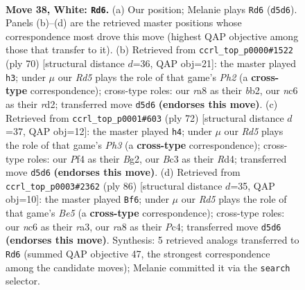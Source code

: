 \documentclass[11pt]{article}
\begin{document}
\clearpage

\begin{figure}[p]\centering
\begin{subfigure}{0.46\textwidth}\centering
\resizebox{\linewidth}{!}{%
\newchessgame
\chessboard[
  setfen={r4k2/7r/p1n5/3R4/1P3P2/2B3K1/P3b3/R7 w - - 9 38},
  showmover=false,
  pgfstyle=straightmove, color=movearrow, markmove={d5-d6}
]}
\caption{}
\end{subfigure}\hfill
\begin{subfigure}{0.46\textwidth}\centering
\resizebox{\linewidth}{!}{%
\newchessgame
\chessboard[
  setfen={7k/5R2/4B1pp/p7/P5P1/8/1b1r1P1P/6K1 w - - 1 36},
  showmover=false,
  pgfstyle=straightmove, color=movearrow, markmove={h2-h3}
]}
\caption{}
\end{subfigure}
\\[4pt]
\begin{subfigure}{0.46\textwidth}\centering
\resizebox{\linewidth}{!}{%
\newchessgame
\chessboard[
  setfen={4r2k/1r3b1p/6p1/8/3RP3/R6P/6B1/7K w - - 3 37},
  showmover=false,
  pgfstyle=straightmove, color=movearrow, markmove={h3-h4}
]}
\caption{}
\end{subfigure}\hfill
\begin{subfigure}{0.46\textwidth}\centering
\resizebox{\linewidth}{!}{%
\newchessgame
\chessboard[
  setfen={4k3/2R5/p5p1/4Bn2/2P2P2/r7/P4K2/8 w - - 6 44},
  showmover=false,
  pgfstyle=straightmove, color=movearrow, markmove={e5-f6}
]}
\caption{}
\end{subfigure}
\caption{\textbf{Move 38, White: \texttt{Rd6}.} (a) Our position; Melanie plays \texttt{Rd6} (\texttt{d5d6}). Panels (b)--(d) are the retrieved master positions whose correspondence most drove this move (highest QAP objective among those that transfer to it). (b) Retrieved from \texttt{ccrl\_top\_p0000\#1522} (ply 70) [structural distance $d$=36, QAP obj=21]: the master played \texttt{h3}; under $\mu$ our \emph{Rd5} plays the role of that game's \emph{Ph2} (a \textbf{cross-type} correspondence); cross-type roles: our \emph{r}a8 as their \emph{b}b2, our \emph{n}c6 as their \emph{r}d2; transferred move \texttt{d5d6} \textbf{(endorses this move)}. (c) Retrieved from \texttt{ccrl\_top\_p0001\#603} (ply 72) [structural distance $d$=37, QAP obj=12]: the master played \texttt{h4}; under $\mu$ our \emph{Rd5} plays the role of that game's \emph{Ph3} (a \textbf{cross-type} correspondence); cross-type roles: our \emph{P}f4 as their \emph{B}g2, our \emph{B}c3 as their \emph{R}d4; transferred move \texttt{d5d6} \textbf{(endorses this move)}. (d) Retrieved from \texttt{ccrl\_top\_p0003\#2362} (ply 86) [structural distance $d$=35, QAP obj=10]: the master played \texttt{Bf6}; under $\mu$ our \emph{Rd5} plays the role of that game's \emph{Be5} (a \textbf{cross-type} correspondence); cross-type roles: our \emph{n}c6 as their \emph{r}a3, our \emph{r}a8 as their \emph{P}c4; transferred move \texttt{d5d6} \textbf{(endorses this move)}. Synthesis: 5 retrieved analogs transferred to \texttt{Rd6} (summed QAP objective 47, the strongest correspondence among the candidate moves); Melanie committed it via the \texttt{search} selector.}
\label{fig:thought-m74}
\end{figure}
\end{document}
